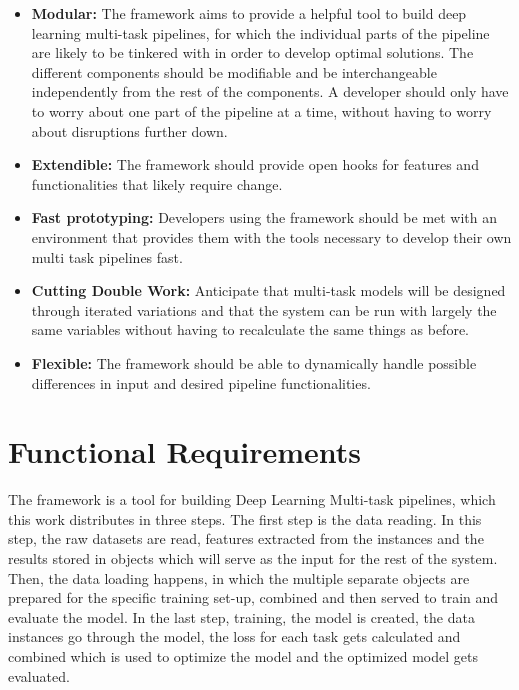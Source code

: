 \begin{itemize}
	\item \textbf{Modular:} The framework aims to provide a helpful tool to build deep learning multi-task pipelines, for which the individual parts of the pipeline are likely to be tinkered with in order to develop optimal solutions. The different components should be modifiable and be interchangeable independently from the rest of the components. A developer should only have to worry about one part of the pipeline at a time, without having to worry about disruptions further down.
	\item \textbf{Extendible:} The framework should provide open hooks for features and functionalities that likely require change. 
	\item \textbf{Fast prototyping:} Developers using the framework should be met with an environment that provides them with the tools necessary to develop their own multi task pipelines fast.
	\item \textbf{Cutting Double Work:} Anticipate that multi-task models will be designed through iterated variations and that the system can be run with largely the same variables without having to recalculate the same things as before.
	\item \textbf{Flexible:} The framework should be able to dynamically handle possible differences in input and desired pipeline functionalities.

\end{itemize}

\section{Functional Requirements}

The framework is a tool for building Deep Learning Multi-task pipelines, which this work distributes in three steps. The first step is the data reading. In this step, the raw datasets are read, features extracted from the instances and the results stored in objects which will serve as the input for the rest of the system. Then, the data loading happens, in which the multiple separate objects are prepared for the specific training set-up, combined and then served to train and evaluate the model. In the last step, training, the model is created, the data instances go through the model, the loss for each task gets calculated and combined which is used to optimize the model and the optimized model gets evaluated. 

